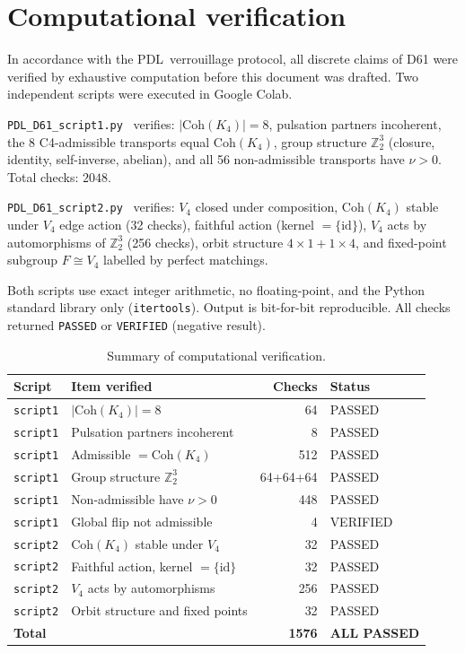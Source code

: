 \documentclass[11pt,a4paper]{article}
\theoremstyle{plain}
\theoremstyle{definition}
\theoremstyle{remark}
\newcommand{\PDL}{\textsc{PDL}}
\newcommand{\Vfour}{V_4}
\newcommand{\Coh}{\mathrm{Coh}(K_4)}
\begin{document}
\section{Computational verification}
\label{sec:computation}

In accordance with the \PDL\ verrouillage protocol, all discrete claims of D61
were verified by exhaustive computation before this document was drafted. Two
independent scripts were executed in Google Colab.

\texttt{PDL\_D61\_script1.py}~\cite{PDL_D61_script1} verifies: $|\Coh| = 8$,
pulsation partners incoherent, the 8 C4-admissible transports equal $\Coh$,
group structure $\mathbb{Z}_2^3$ (closure, identity, self-inverse, abelian),
and all 56 non-admissible transports have $\nu > 0$. Total checks: $2048$.

\texttt{PDL\_D61\_script2.py}~\cite{PDL_D61_script2} verifies: $\Vfour$ closed
under composition, $\Coh$ stable under $\Vfour$ edge action (32 checks), faithful
action (kernel $= \{\mathrm{id}\}$), $\Vfour$ acts by automorphisms of $\mathbb{Z}_2^3$
(256 checks), orbit structure $4 \times 1 + 1 \times 4$, and fixed-point subgroup
$F \cong \Vfour$ labelled by perfect matchings.

Both scripts use exact integer arithmetic, no floating-point, and the Python
standard library only (\texttt{itertools}). Output is bit-for-bit reproducible.
All checks returned \texttt{PASSED} or \texttt{VERIFIED} (negative result).

\begin{table}[H]
\centering
\caption{Summary of computational verification.}
\label{tab:verification}
\small
\renewcommand{\arraystretch}{1.2}
\begin{tabular}{llr l}
\toprule
Script & Item verified & Checks & Status \\
\midrule
\texttt{script1} & $|\Coh| = 8$ & 64 & PASSED \\
\texttt{script1} & Pulsation partners incoherent & 8 & PASSED \\
\texttt{script1} & Admissible $= \Coh$ & 512 & PASSED \\
\texttt{script1} & Group structure $\mathbb{Z}_2^3$ & 64+64+64 & PASSED \\
\texttt{script1} & Non-admissible have $\nu > 0$ & 448 & PASSED \\
\texttt{script1} & Global flip not admissible & 4 & VERIFIED \\
\texttt{script2} & $\Coh$ stable under $\Vfour$ & 32 & PASSED \\
\texttt{script2} & Faithful action, kernel $= \{\mathrm{id}\}$ & 32 & PASSED \\
\texttt{script2} & $\Vfour$ acts by automorphisms & 256 & PASSED \\
\texttt{script2} & Orbit structure and fixed points & 32 & PASSED \\
\midrule
\textbf{Total} & & \textbf{1576} & \textbf{ALL PASSED} \\
\bottomrule
\end{tabular}
\end{table}

\clearpage


\end{document}
